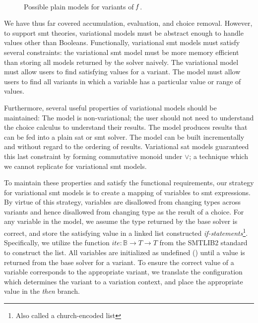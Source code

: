 ~\label{section:vsmt:models}
\begin{figure}[h]
    \centering
    \caption{Possible plain models for variants of $\mathit{f}$.}%
    \label{fig:vsmt:models:plain}
\end{figure}
We have thus far covered accumulation, evaluation, and choice removal. However,
to support \ac{smt} theories, variational models must be abstract enough to
handle values other than Booleans. Functionally, variational \ac{smt} models
must satisfy several constraints: the variational \ac{smt} model must be more
memory efficient than storing all models returned by the solver naively. The
variational model must allow users to find satisfying values for a variant. The
model must allow users to find all variants in which a variable has a particular
value or range of values.

Furthermore, several useful properties of variational models should be
maintained: The model is non-variational; the user should not need to understand
the choice calculus to understand their results. The model produces results that
can be fed into a plain \ac{sat} or \ac{smt} solver. The model can be built
incrementally and without regard to the ordering of results. Variational
\ac{sat} models guaranteed this last constraint by forming commutative monoid
under $\vee$; a technique which we cannot replicate for variational \ac{smt}
models.

To maintain these properties and satisfy the functional requirements, our
strategy for variational \ac{smt} models is to create a mapping of variables to
\ac{smt} expressions. By virtue of this strategy, variables are disallowed from
changing types across variants and hence disallowed from changing type as the
result of a choice. For any variable in the model, we assume the type returned
by the base solver is correct, and store the satisfying value in a linked list
constructed \emph{if-statements}\footnote{Also called a church-encoded list}.
Specifically, we utilize the function $ite : \mathbb{B} \rightarrow T
\rightarrow T$ from the SMTLIB2 standard to construct the list. All variables
are initialized as undefined (\undefined) until a value is returned from the
base solver for a variant. To ensure the correct value of a variable corresponds
to the appropriate variant, we translate the configuration which determines the
variant to a variation context, and place the appropriate value in the
\emph{then} branch.

